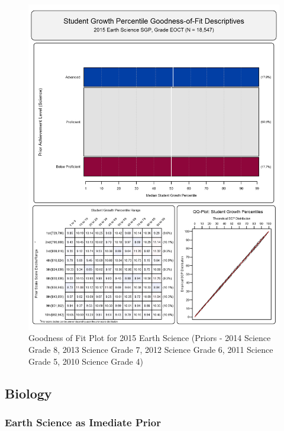 \documentclass[12pt]{article}
\begin{document}
\begin{figure}[htbp]
\centering
\includegraphics{../img/Goodness_of_Fit/EARTH_SCIENCE.2015/2015_EARTH_SCIENCE_EOCT;2014_SCIENCE_8;2013_SCIENCE_7;2012_SCIENCE_6;2011_SCIENCE_5;2010_SCIENCE_4.png}
\caption{Goodness of Fit Plot for 2015 Earth Science (Priors - 2014
Science Grade 8, 2013 Science Grade 7, 2012 Science Grade 6, 2011
Science Grade 5, 2010 Science Grade 4)}
\end{figure}

\clearpage 

\subsection{Biology}\label{biology}

\subsubsection{Earth Science as Imediate
Prior}\label{earth-science-as-imediate-prior}
\end{document}
